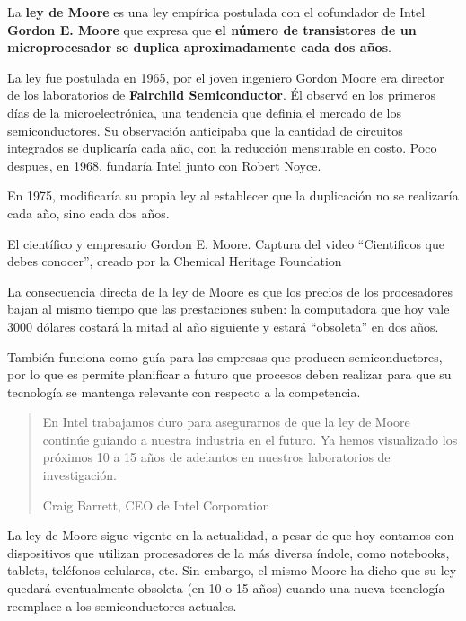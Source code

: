 La \textbf{ley de Moore} es una ley empírica postulada con el cofundador de
Intel \textbf{Gordon E. Moore} que expresa que \textbf{el número de transistores
de un microprocesador se duplica aproximadamente cada dos años}.

La ley fue postulada en 1965, por el joven ingeniero Gordon Moore era director
de los laboratorios de \textbf{Fairchild Semiconductor}. Él observó en los
primeros días de la microelectrónica, una tendencia que definía el mercado de
los semiconductores. Su observación anticipaba que la cantidad de circuitos
integrados se duplicaría cada año, con la reducción mensurable en costo. Poco
despues, en 1968, fundaría Intel junto con Robert Noyce.

En 1975, modificaría su propia ley al establecer que la duplicación no se
realizaría cada año, sino cada dos años.

{El científico y empresario Gordon E. Moore.} {Captura del video ``Cientificos
que debes conocer'', creado por la Chemical Heritage Foundation}

La consecuencia directa de la ley de Moore es que los precios de los
procesadores bajan al mismo tiempo que las prestaciones suben: la computadora
que hoy vale 3000 dólares costará la mitad al año siguiente y estará
``obsoleta'' en dos años.

También funciona como guía para las empresas que producen semiconductores, por
lo que es permite planificar a futuro que procesos deben realizar para que su
tecnología se mantenga relevante con respecto a la competencia.

\begin{quote}
    En Intel trabajamos duro para asegurarnos de que la ley de Moore continúe
    guiando a nuestra industria en el futuro. Ya hemos visualizado los próximos
    10 a 15 años de adelantos en nuestros laboratorios de investigación.
    \begin{flushright}
    Craig Barrett, CEO de Intel Corporation
    \end{flushright}
\end{quote}

La ley de Moore sigue vigente en la actualidad, a pesar de que hoy contamos con
dispositivos que utilizan procesadores de la más diversa índole, como notebooks,
tablets, teléfonos celulares, etc. Sin embargo, el mismo Moore ha dicho que su
ley quedará eventualmente obsoleta (en 10 o 15 años) cuando una nueva tecnología
reemplace a los semiconductores actuales.
\vspace{1cm}

